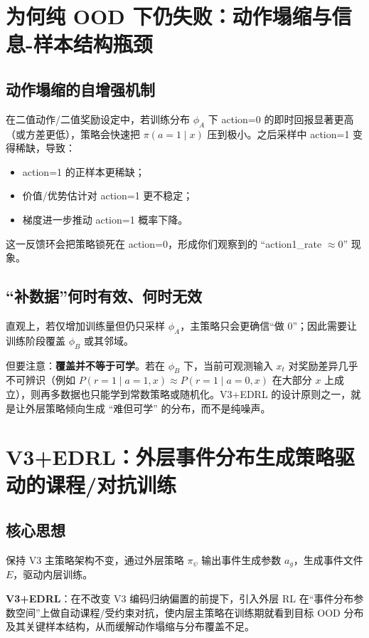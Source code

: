 \documentclass[UTF8,11pt,a4paper]{ctexart}
\begin{document}
\section{为何纯 OOD 下仍失败：动作塌缩与信息-样本结构瓶颈}

\subsection{动作塌缩的自增强机制}
在二值动作/二值奖励设定中，若训练分布 $\phi_A$ 下 action=0 的即时回报显著更高（或方差更低），策略会快速把 $\pi(a=1\mid x)$ 压到极小。之后采样中 action=1 变得稀缺，导致：
\begin{itemize}
\item action=1 的正样本更稀缺；
\item 价值/优势估计对 action=1 更不稳定；
\item 梯度进一步推动 action=1 概率下降。
\end{itemize}
这一反馈环会把策略锁死在 action=0，形成你们观察到的 ``action1\_rate $\approx 0$'' 现象。

\subsection{``补数据''何时有效、何时无效}
直观上，若仅增加训练量但仍只采样 $\phi_A$，主策略只会更确信``做 0''；因此需要让训练阶段覆盖 $\phi_B$ 或其邻域。

但要注意：\textbf{覆盖并不等于可学}。若在 $\phi_B$ 下，当前可观测输入 $x_t$ 对奖励差异几乎不可辨识（例如 $P(r=1\mid a=1,x)\approx P(r=1\mid a=0,x)$ 在大部分 $x$ 上成立），则再多数据也只能学到常数策略或随机化。V3+EDRL 的设计原则之一，就是让外层策略倾向生成 ``难但可学'' 的分布，而不是纯噪声。

\section{V3+EDRL：外层事件分布生成策略驱动的课程/对抗训练}

\subsection{核心思想}
保持 V3 主策略架构不变，通过外层策略 $\pi_\psi$ 输出事件生成参数 $a_g$，生成事件文件 $E$，驱动内层训练。

\begin{tcolorbox}[title=一句话定义,width=\textwidth,colback=gray!4]
\textbf{V3+EDRL}：\;在不改变 V3 编码归纳偏置的前提下，引入外层 RL 在``事件分布参数空间''上做自动课程/受约束对抗，使内层主策略在训练期就看到目标 OOD 分布及其关键样本结构，从而缓解动作塌缩与分布覆盖不足。
\end{tcolorbox}
\end{document}

